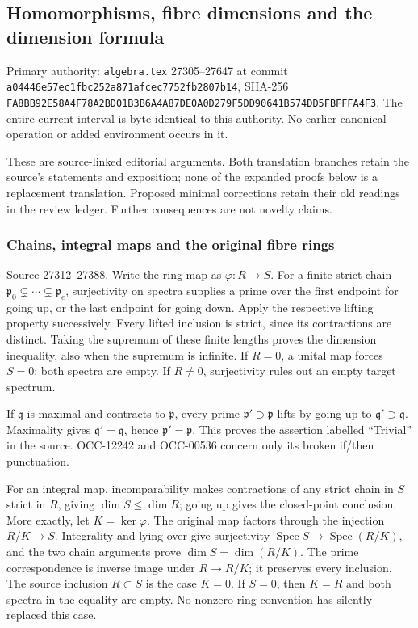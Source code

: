 \subsection{Homomorphisms, fibre dimensions and the dimension formula}\label{algebra-proof-024-homomorphisms-fibre-dimensions-and-the-dimension-formula}

Primary authority: \texttt{algebra.tex} 27305--27647 at commit \texttt{a04446e57ec1fbc252a871afcec7752fb2807b14}, SHA-256 \texttt{FA8BB92E58A4F78A2BD01B3B6A4A87DE0A0D279F5DD90641B574DD5FBFFFA4F3}. The entire current interval is byte-identical to this authority. No earlier canonical operation or added environment occurs in it.

These are source-linked editorial arguments. Both translation branches retain the source's statements and exposition; none of the expanded proofs below is a replacement translation. Proposed minimal corrections retain their old readings in the review ledger. Further consequences are not novelty claims.

\subsubsection{Chains, integral maps and the original fibre rings}\label{algebra-proof-024-chains-integral-maps-and-the-original-fibre-rings}

Source 27312--27388. Write the ring map as \(\varphi:R\to S\). For a finite strict chain \(\mathfrak p_0\subsetneq\cdots\subsetneq
\mathfrak p_e\), surjectivity on spectra supplies a prime over the first endpoint for going up, or the last endpoint for going down. Apply the respective lifting property successively. Every lifted inclusion is strict, since its contractions are distinct. Taking the supremum of these finite lengths proves the dimension inequality, also when the supremum is infinite. If \(R=0\), a unital map forces \(S=0\); both spectra are empty. If \(R\ne0\), surjectivity rules out an empty target spectrum.

If \(\mathfrak q\) is maximal and contracts to \(\mathfrak p\), every prime \(\mathfrak p'\supset\mathfrak p\) lifts by going up to \(\mathfrak q'\supset\mathfrak q\). Maximality gives \(\mathfrak q'=\mathfrak q\), hence \(\mathfrak p'=\mathfrak p\). This proves the assertion labelled ``Trivial'' in the source. OCC-12242 and OCC-00536 concern only its broken if/then punctuation.

For an integral map, incomparability makes contractions of any strict chain in \(S\) strict in \(R\), giving \(\dim S\leq\dim R\); going up gives the closed-point conclusion. More exactly, let \(K=\ker\varphi\). The original map factors through the injection \(R/K\to S\). Integrality and lying over give surjectivity \(\operatorname{Spec}S\to\operatorname{Spec}(R/K)\), and the two chain arguments prove \(\dim S=\dim(R/K)\). The prime correspondence is inverse image under \(R\to R/K\); it preserves every inclusion. The source inclusion \(R\subset S\) is the case \(K=0\). If \(S=0\), then \(K=R\) and both spectra in the equality are empty. No nonzero-ring convention has silently replaced this case.

